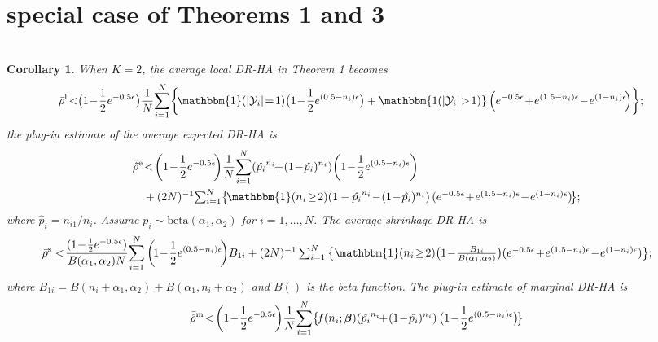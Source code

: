 \documentclass[10pt,journal,compsoc]{IEEEtran}
\newtheorem{cor}[thm]{\vspace{-6pt}\\ Corollary}
\newcommand{\bs}{\boldsymbol}
\begin{document}
\vspace{-24pt}
\section{\large special case of Theorems 1 and 3} \label{app:special}\vspace{-6pt}
\begin{cor}\label{cor:rho.lap}
When $K\!=\!2$,  the average local DR-HA in Theorem 1 becomes
\begin{align}
\bar{\rho}^{\text{l}}\!<&\big(1\!-\!\frac{1}{2}e^{-0.5\epsilon}\big)\frac{1}{N}\!\sum_{i=1}^N\!\bigg\{\! 
\mathbbm{1}(|\mathcal{Y}_i|\!=\!1)\big(1\!-\!\frac{1}{2}e^{(0.5-n_i)\epsilon}\big)+\mathbbm{1(|\mathcal{Y}_i|\!>\!1)}\left(e^{-0.5\epsilon}\!+\!e^{(1.5-n_i)\epsilon}\!-\!e^{(1-n_i)\epsilon}\!\right)\!\bigg\};\label{eqn:average.l}
\end{align}
the plug-in estimate of the average expected DR-HA is \vspace{-3pt}
\begin{align}
\bar{\hat{\rho}}^{\text{e}}
&\!<\!\left(1\!-\!\frac{1}{2}e^{-0.5\epsilon}\!\right)\!\frac{1}{N}\!\sum_{i=1}^N\!\left(\hat{p_i}^{n_i}\!\!+\!(1\!-\!\hat{p_i})^{n_i}\right)\!\left(1\!-\!\frac{1}{2}e^{(0.5-n_i)\epsilon}\right)\notag\\
&+\textstyle(2N)^{-1}\!\sum_{i=1}^N\!\big\{\! \mathbbm{1}(n_i\!\ge\!2)\!\left(1-\hat{p_i}^{n_i}\!-\!(1\!-\!\hat{p_i})^{n_i}\right)(e^{-0.5\epsilon}\!+\!e^{(1.5-n_i)\epsilon}\!-\!e^{(1-n_i)\epsilon})\!\big\};\label{eqn:average.e}\vspace{-3pt}
\end{align}
where $\hat{p}_i=n_{i1}/n_i$.  Assume $p_i\sim\mbox{beta}(\alpha_1,\alpha_2)$ for $i=1,\ldots,N$. The average shrinkage DR-HA  is
\begin{align}
\!\!\!\!\bar\rho^{\text{s}}&
<\!\frac{(1\!-\!\frac{1}{2}e^{-0.5\epsilon})}{B(\alpha_1,\alpha_2)N}\!
\sum_{i=1}^N\left(\!1\!-\!\frac{1}{2}e^{(0.5-n_i)\epsilon}\!\right)\!B_{1i}+\textstyle(2N)^{-1}\sum_{i=1}^{N}\big\{\mathbbm{1}(n_i\!\ge\!2)\big(1\!-\!\frac{B_{1i}}{B(\alpha_1,\alpha_2)}\big)(e^{-0.5\epsilon}\!+\!e^{(1.5-n_i)\epsilon}\!-\!e^{(1-n_i)\epsilon})\big\};\label{eqn:average.s}
\end{align}
where $B_{1i}=B(n_i+\alpha_1,\alpha_2)+B(\alpha_1,n_i+\alpha_2)$ and  $B( )$ is the beta function. The plug-in estimate of marginal DR-HA  is
\begin{align}
\bar{\hat{\rho}}^{\text{m}}
&\!<\!\left(1\!-\!\frac{1}{2}e^{-0.5\epsilon}\!\right)\!\frac{1}{N}\!\sum_{i=1}^N\!\big\{\!f(n_i;\bs\beta)\!\left(\hat{p_i}^{n_i}\!\!+\!(1\!-\!\hat{p_i})^{n_i}\right)\big(1\!-\!\frac{1}{2}e^{(0.5-n_i)\epsilon}\big)\!\big\}\notag\\

\end{align}
\end{cor}
\end{document}
